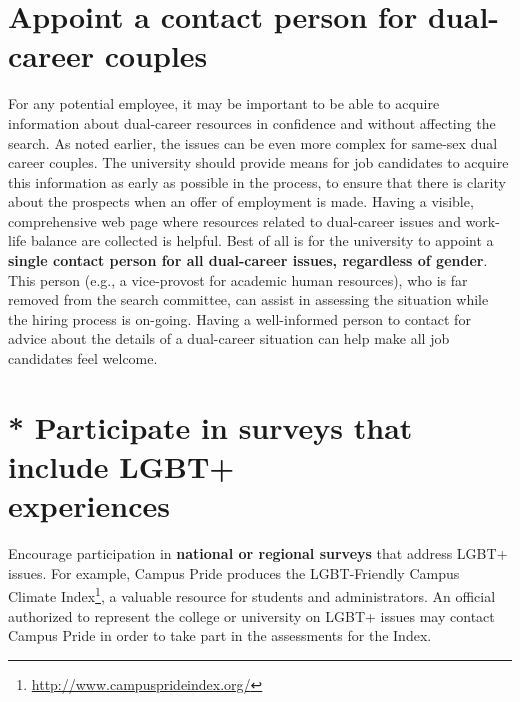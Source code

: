 \section {Appoint a contact person for dual-career couples}
\label{dual-career-contact}
For any potential employee, it may be important to be able to acquire information about dual-career resources in confidence and without affecting the search.  As noted earlier, the issues can be even more complex for same-sex dual career couples. The university should provide means for job candidates to acquire this information as early as possible in the process, to ensure that there is clarity about the prospects when an offer of employment is made.  Having a visible, comprehensive web page where resources related to dual-career issues and work-life balance are collected is helpful.  Best of all is for the university to appoint a \textbf{single contact person for all dual-career issues, regardless of gender}. This person (e.g., a vice-provost for academic human resources), who is far removed from the search committee, can assist in assessing the situation while the hiring process is on-going.  Having a well-informed person to contact for advice about the details of a dual-career situation can help make all job candidates feel welcome.


\section [* Participate in surveys that include LGBT+ experiences]{* Participate in surveys that include LGBT+ \\experiences}
\label{univ-surveys}
Encourage participation in \textbf{national or regional surveys} that address LGBT+ issues. For example, Campus Pride produces the LGBT-Friendly Campus Climate Index\footnote{\href{http://www.campusprideindex.org/}{http://www.campusprideindex.org/}}, a valuable resource for students and administrators. An official authorized to represent the college or university on LGBT+ issues may contact Campus Pride in order to take part in the assessments for the Index.



